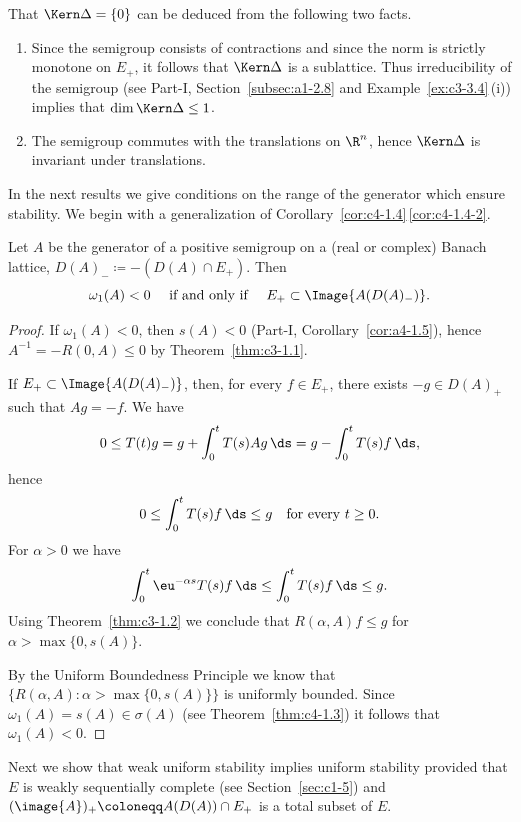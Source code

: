That $\Kern\Delta = \{0\}$ can be deduced from the following two facts.
\begin{enumerate}[\upshape (i), wide, labelindent=.25em]
\item 
Since the semigroup consists of contractions and since the norm is strictly monotone on $E_{+}$, it follows that $\Kern\Delta$ is a sublattice.
Thus irreducibility of the semigroup (see Part-I, Section~\ref{subsec:a1-2.8} and Example~\ref{ex:c3-3.4}\,(i)) implies that $\dim \Kern\Delta \leq 1$.

\item 
The semigroup commutes with the translations on $\R^{n}$, hence $\Kern\Delta$ is invariant under translations.

\end{enumerate}
In the next results we give conditions on the range of the generator which ensure stability.
We begin with a generalization of Corollary~\ref{cor:c4-1.4}\,\ref{cor:c4-1.4-2}.
\begin{proposition}\label{prop:c4-1.6}
%
Let $A$ be the generator of a positive semigroup on a (real or complex) Banach lattice, $D(A)_{-} \coloneqq -(D(A) \cap E_{+})$.
Then 
\[ 
\text{$\omega_{1}(A) < 0 $ \quad if and only if \quad $E_{+} \subset \Image{A(D(A)_{-})}$.}
\]
\end{proposition}
\begin{proof}
If\/ $\omega_{1}(A) < 0$, then $s(A) < 0$ (Part-I, Corollary~\ref{cor:a4-1.5}), hence $A^{-1} = -R(0,A) \leq 0$ by Theorem~\ref{thm:c3-1.1}.

If\/ $E_{+} \subset \Image{A(D(A)_{-})}$, then, for every $f \in E_{+}$, there exists $-g \in D(A)_{+}$ such that $Ag = -f$.
We have 
\[
0 \leq T(t)g = g + \int_{0}^{t} T(s)Ag \, \ds = g - \int_{0}^{t} T(s)f \, \ds,
\]
hence 
\[
0 \leq \int_{0}^{t} T(s)f \, \ds \leq g 
\quad \text{for every $t \geq 0$.}
\]
For $\alpha > 0$ we have 
\[
\int_{0}^{t} \eu^{-\alpha s}T(s)f \, \ds \leq \int_{0}^{t} T(s)f \, \ds \leq g .
\]
Using Theorem~\ref{thm:c3-1.2}  we conclude that $R(\alpha,A)f \leq g$ for $\alpha > \max\{0,s(A)\}$.

By the Uniform Boundedness Principle we know that $\{R(\alpha,A) \colon \alpha > \max\{0,s(A)\}\}$ is uniformly bounded.
Since $\omega_{1}(A) = s(A) \in \sigma(A)$ (see Theorem~\ref{thm:c4-1.3}) it follows that $\omega_{1}(A) < 0$.
\end{proof}
Next we show that weak uniform stability implies uniform stability provided that $E$ is weakly sequentially complete (see Section~\ref{sec:c1-5}) and $(\image{A})_{+} \coloneqq A(D(A)) \cap E_{+}$ is a total subset of\/ $E$.
